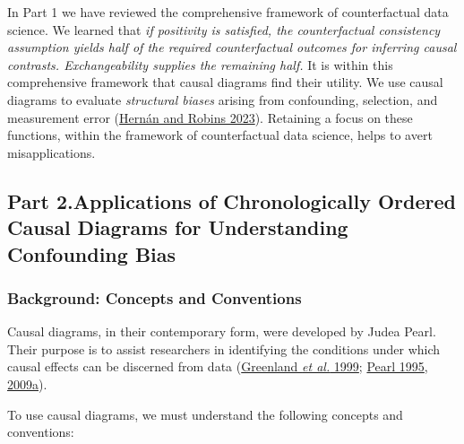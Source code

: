 \documentclass[
  singlecolumn]{article}
\begin{document}
In Part 1 we have reviewed the comprehensive framework of counterfactual
data science. We learned that \emph{if positivity is satisfied, the
counterfactual consistency assumption yields half of the required
counterfactual outcomes for inferring causal contrasts. Exchangeability
supplies the remaining half.} It is within this comprehensive framework
that causal diagrams find their utility. We use causal diagrams to
evaluate \emph{structural biases} arising from confounding, selection,
and measurement error (\protect\hyperlink{ref-hernuxe1n2023}{Hernán and
Robins 2023}). Retaining a focus on these functions, within the
framework of counterfactual data science, helps to avert
misapplications.

\hypertarget{part-2.applications-of-chronologically-ordered-causal-diagrams-for-understanding-confounding-bias}{%
\subsection{Part 2.Applications of Chronologically Ordered Causal
Diagrams for Understanding Confounding
Bias}\label{part-2.applications-of-chronologically-ordered-causal-diagrams-for-understanding-confounding-bias}}

\hypertarget{background-concepts-and-conventions}{%
\subsubsection{Background: Concepts and
Conventions}\label{background-concepts-and-conventions}}

Causal diagrams, in their contemporary form, were developed by Judea
Pearl. Their purpose is to assist researchers in identifying the
conditions under which causal effects can be discerned from data
(\protect\hyperlink{ref-greenland1999}{Greenland \emph{et al.} 1999};
\protect\hyperlink{ref-pearl1995}{Pearl 1995},
\protect\hyperlink{ref-pearl2009}{2009a}).

To use causal diagrams, we must understand the following concepts and
conventions:
\end{document}
